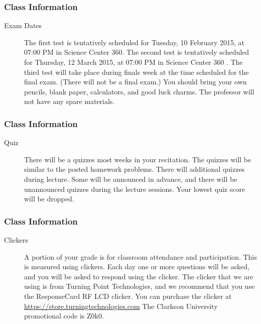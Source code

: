 \begin{frame}
  \frametitle{Class Information}

\begin{description}
\item[Exam Dates] The first test is tentatively scheduled for Tuesday,
  10 February 2015, at 07:00 PM in Science Center 360. The second test
  is tentatively scheduled for Thursday, 12 March 2015, at 07:00 PM in
  Science Center 360 . The third test will take place during finals
  week at the time scheduled for the final exam. (There will not be a
  final exam.) You should bring your own pencils, blank paper,
  calculators, and good luck charms.  The professor will not have any
  spare materials.
 
\end{description}

\end{frame}

\begin{frame}
  \frametitle{Class Information}

\begin{description}
\item[Quiz] There will be a quizzes most weeks in your recitation. The
  quizzes will be similar to the posted homework problems. There will
  additional quizzes during lecture. Some will be announced in
  advance, and there will be unannounced quizzes during the lecture
  sessions.  Your lowest quiz score will be dropped.

\end{description}

\end{frame}


\begin{frame}
  \frametitle{Class Information}

\begin{description}
  \item[Clickers] A portion of your grade is for classroom attendance
    and participation. This is measured using clickers. Each day one
    or more questions will be asked, and you will be asked to respond
    using the clicker. The clicker that we are using is from Turning
    Point Technologies, and we recommend that you use the ResponseCard
    RF LCD clicker. You can purchase the clicker at
    \url{https://store.turningtechnologies.com} The Clarkson
    University promotional code is Z0k0.

\end{description}

\end{frame}

